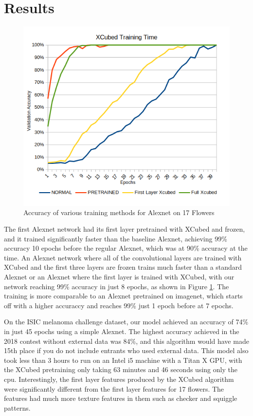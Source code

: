 \documentclass{article}
\begin{document}
\section{Results}
\begin{figure}
    \centering
    \includegraphics[width=.8\linewidth]{X3GRAPH}
    \caption{Accuracy of various training methods for Alexnet on 17 Flowers}
    \label{fig:netspeedup}
\end{figure}
The first Alexnet network had its first layer pretrained with XCubed and frozen, and it trained significantly faster than the baseline Alexnet, achieving 99\% accuracy 10 epochs before the regular Alexnet, which was at 90\% accuracy at the time. An Alexnet network where all of the convolutional layers are trained with XCubed and the first three layers are frozen trains much faster than a standard Alexnet or an Alexnet where the first layer is trained with XCubed, with our network reaching 99\% accuracy in just 8 epochs, as shown in Figure \ref{fig:netspeedup}. The training is more comparable to an Alexnet pretrained on imagenet, which starts off with a higher accuraccy and reaches 99\% just 1 epoch before at 7 epochs.

On the ISIC melanoma challenge dataset, our model achieved an accuracy of 74\% in just 45 epochs using a simple Alexnet. The highest accuracy achieved in the 2018 contest without external data was 84\%, and this algorithm would have made 15th place if you do not include entrants who used external data. This model also took less than 3 hours to run on an Intel i5 machine with a Titan X GPU, with the XCubed pretraining only taking 63 minutes and 46 seconds using only the cpu. Interestingly, the first layer features produced by the XCubed algorithm were significantly different from the first layer features for 17 flowers. The features had much more texture features in them such as checker and squiggle patterns.
\end{document}
